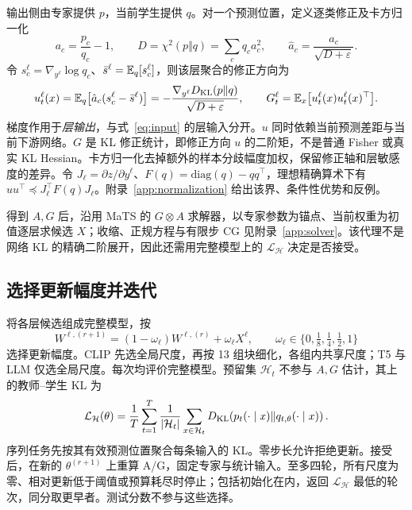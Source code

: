 输出侧由专家提供 $p$，当前学生提供 $q$。对一个预测位置，定义逐类修正及卡方归一化
\begin{equation}
 a_c=\frac{p_c}{q_c}-1,\qquad
 D=\chi^2(p\Vert q)=\sum_c q_c a_c^2,\qquad
 \hat a_c=\frac{a_c}{\sqrt{D+\varepsilon}}.
 \label{eq:normalization}
\end{equation}
令 $s_c^\ell=\nabla_{y^\ell}\log q_c$、$\bar s^\ell=\mathbb E_q[s_c^\ell]$，则该层聚合的修正方向为
\begin{equation}
 u_t^\ell(x)=\mathbb E_q\big[\hat a_c(s_c^\ell-\bar s^\ell)\big]
 =-\frac{\nabla_{y^\ell}D_{\mathrm{KL}}(p\Vert q)}{\sqrt{D+\varepsilon}},
 \qquad
 G_t^\ell=\mathbb E_x\big[u_t^\ell(x)u_t^\ell(x)^\top\big].
 \label{eq:moments}
\end{equation}
梯度作用于\emph{层输出}，与式~\eqref{eq:input} 的层输入分开。$u$ 同时依赖当前预测差距与当前下游网络。$G$ 是 KL 修正统计，即修正方向 $u$ 的二阶矩，不是普通 Fisher 或真实 KL Hessian。卡方归一化去掉额外的样本分歧幅度加权，保留修正轴和层敏感度的差异。令 $J_\ell=\partial z/\partial y^\ell$、$F(q)=\mathrm{diag}(q)-qq^\top$，理想精确算术下有 $uu^\top\preceq J_\ell^\top F(q)J_\ell$。附录~\ref{app:normalization} 给出该界、条件性优势和反例。

得到 $A,G$ 后，沿用 MaTS 的 $G\otimes A$ 求解器，以专家参数为锚点、当前权重为初值逐层求候选 $X$；收缩、正规方程与有限步 CG 见附录~\ref{app:solver}。该代理不是网络 KL 的精确二阶展开，因此还需用完整模型上的 $\mathcal L_{\mathcal H}$ 决定是否接受。

\subsection{选择更新幅度并迭代}
将各层候选组成完整模型，按
\begin{equation}
 W^{\ell,(r+1)}=(1-\omega_\ell)W^{\ell,(r)}+\omega_\ell X^\ell,
 \qquad\omega_\ell\in\{0,\tfrac18,\tfrac14,\tfrac12,1\}
 \label{eq:update}
\end{equation}
选择更新幅度。CLIP 先选全局尺度，再按 13 组块细化，各组内共享尺度；T5 与 LLM 仅选全局尺度。每次均评价完整模型。预留集 $\mathcal H_t$ 不参与 $A,G$ 估计，其上的教师–学生 KL 为
\begin{equation}
 \mathcal L_{\mathcal H}(\theta)=\frac1T\sum_{t=1}^T\frac1{|\mathcal H_t|}
 \sum_{x\in\mathcal H_t}D_{\mathrm{KL}}\!\left(p_t(\cdot\mid x)\Vert q_{t,\theta}(\cdot\mid x)\right).
 \label{eq:behavior}
\end{equation}
序列任务先按其有效预测位置聚合每条输入的 KL。零步长允许拒绝更新。接受后，在新的 $\theta^{(r+1)}$ 上重算 A/G，固定专家与统计输入。至多四轮，所有尺度为零、相对更新低于阈值或预算耗尽时停止；包括初始化在内，返回 $\mathcal L_{\mathcal H}$ 最低的轮次，同分取更早者。测试分数不参与这些选择。

